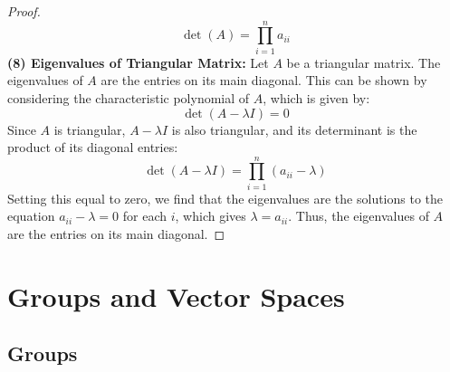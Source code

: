 \documentclass[openany]{book}
\begin{document}
\begin{proof}
    \[\det(A) = \prod_{i=1}^{n} a_{ii}\]
    \textbf{(8) Eigenvalues of Triangular Matrix:} Let $A$ be a triangular matrix. The eigenvalues of $A$ are the entries on its main diagonal. This can be shown by considering the characteristic polynomial of $A$, which is given by:
    \[\det(A - \lambda I) = 0\]
    Since $A$ is triangular, $A - \lambda I$ is also triangular, and its determinant is the product of its diagonal entries:
    \[\det(A - \lambda I) = \prod_{i=1}^{n} (a_{ii} - \lambda)\]
    Setting this equal to zero, we find that the eigenvalues are the solutions to the equation $a_{ii} - \lambda = 0$ for each $i$, which gives $\lambda = a_{ii}$. Thus, the eigenvalues of $A$ are the entries on its main diagonal.
\end{proof}
\chapter{Groups and Vector Spaces}
\section{Groups}
\end{document}
